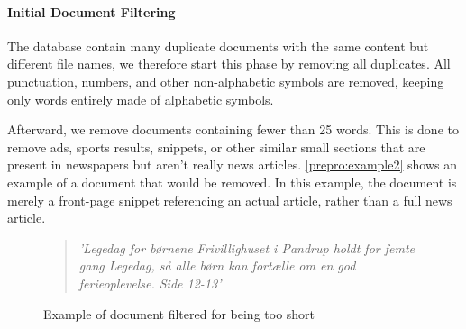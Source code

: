 \paragraph{Initial Document Filtering}
The database contain many duplicate documents with the same content but different file names, we therefore start this phase by removing all duplicates.
All punctuation, numbers, and other non-alphabetic symbols are removed, keeping only words entirely made of alphabetic symbols.

Afterward, we remove documents containing fewer than 25 words.
This is done to remove ads, sports results, snippets, or other similar small sections that are present in newspapers but aren't really news articles.
\autoref{prepro:example2} shows an example of a document that would be removed. In this example, the document is merely a front-page snippet referencing an actual article, rather than a full news article.
\begin{figure}[h]
	\begin{framed}
		\begin{quote}
			\textit{
				'Legedag for børnene Frivillighuset i Pandrup holdt for femte gang Legedag, så alle børn kan fortælle om en god ferieoplevelse. Side 12-13'
			}
		\end{quote}
	\end{framed}
	\caption{Example of document filtered for being too short}
	\label{prepro:example2}
\end{figure}


